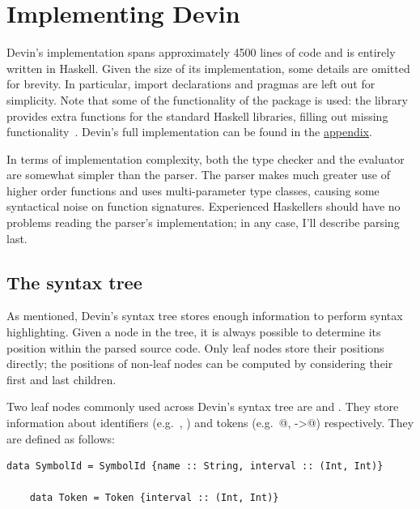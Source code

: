 \documentclass[UdineBachThesis,american,11pt]{PhdThesis}
\begin{document}
  \newpage

  \thispagestyle{empty}

  \chapter{Implementing Devin}

  Devin's implementation spans approximately 4500 lines of code and is entirely
  written in Haskell. Given the size of its implementation, some details are
  omitted for brevity. In particular, import declarations and
  \lstinline@LANGUAGE@ pragmas are left out for simplicity. Note that some of
  the functionality of the package \lstinline@extra@ is used: the library
  provides extra functions for the standard Haskell libraries, filling out
  missing functionality~\cite{extra}. Devin's full implementation can be found
  in the \hyperref[chapter:devin-source-code]{appendix}.

  In terms of implementation complexity, both the type checker and the evaluator
  are somewhat simpler than the parser. The parser makes much greater use of
  higher order functions and uses multi-parameter type classes, causing some
  syntactical noise on function signatures. Experienced Haskellers should have
  no problems reading the parser's implementation; in any case, I'll describe
  parsing last.

  \section{The syntax tree}

  As mentioned, Devin's syntax tree stores enough information to perform syntax
  highlighting. Given a node in the tree, it is always possible to determine its
  position within the parsed source code. Only leaf nodes store their positions
  directly; the positions of non-leaf nodes can be computed by considering their
  first and last children.

  Two leaf nodes commonly used across Devin's syntax tree are
  \lstinline@SymbolId@ and \lstinline@Token@. They store information about
  identifiers (e.g.\ \lstinline@x@, \lstinline@Int@) and tokens (e.g.\
  @, \lstinline@->@) respectively. They are defined
  as follows:

  \begin{lstlisting}[gobble=4,basicstyle=\ttfamily\small]
    data SymbolId = SymbolId {name :: String, interval :: (Int, Int)}

    data Token = Token {interval :: (Int, Int)}
  \end{lstlisting}
\end{document}
